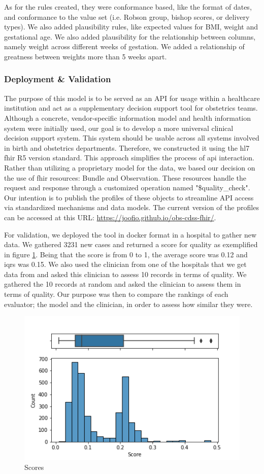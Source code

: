 As for the rules created, they were conformance based, like the format of dates, and conformance to the value set (i.e. Robson group, bishop scores, or delivery types). We also added plausibility rules, like expected values for BMI, weight and gestational age. We also added plausibility for the relationship between columns, namely weight across different weeks of gestation. We added a relationship of greatness between weights more than 5 weeks apart. 





\subsubsection{Deployment \& Validation} 
The purpose of this model is to be served as an API for usage within a healthcare institution and act as a supplementary decision support tool for obstetrics teams. Although a concrete, vendor-specific information model and health information system were initially used, our goal is to develop a more universal clinical decision support system. This system should be usable across all systems involved in birth and obstetrics departments. Therefore, we constructed it using the \ac{hl7} \ac{fhir}  R5 version standard. This approach simplifies the process of \ac{api} interaction.
Rather than utilizing a proprietary model for the data, we based our decision on the use of \ac{fhir} resources: Bundle and Observation. These resources handle the request and response through a customized operation named "\$quality\_check". Our intention is to publish the profiles of these objects to streamline API access via standardized mechanisms and data models. The current version of the profiles can be accessed at this URL: \url{https://joofio.github.io/obs-cdss-fhir/}. 


For validation, we deployed the tool in docker format in a hospital to gather new data. We gathered 3231 new cases and returned a score for quality as exemplified in figure \ref{fig:scores}. Being that the score is from 0 to 1, the average score was 0.12 and \acp{iqr} was 0.15. We also used the clinician from one of the hospitals that we get data from and asked this clinician to assess 10 records in terms of quality. We gathered the 10 records at random and asked the clinician to assess them in terms of quality. Our purpose was then to compare the rankings of each evaluator; the model and the clinician, in order to assess how similar they were.



\begin{figure}[htbp]
\centering
\caption{Scores}\label{fig:scores} 
\includegraphics[scale=0.78]{figures/Scoring.png}
\end{figure}
